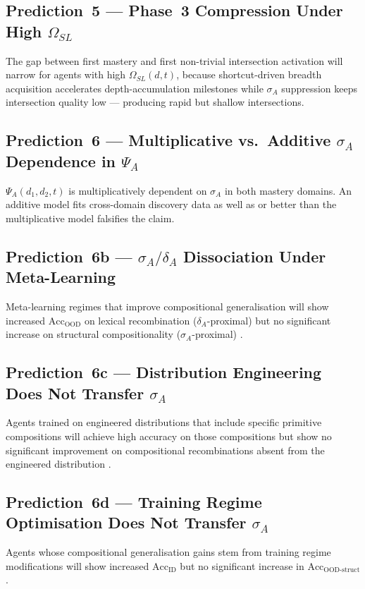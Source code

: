 \documentclass[11pt,a4paper]{article}
\begin{document}
\subsection{Prediction~5 --- Phase~3 Compression Under High \texorpdfstring{$\Omega_{SL}$}{Omega\_AI}}
The gap between first mastery and first non-trivial intersection
activation will narrow for agents with high $\Omega_{SL}(d,t)$, because shortcut-driven breadth acquisition accelerates depth-accumulation milestones while $\sigma_A$ suppression keeps intersection quality low --- producing rapid but shallow intersections.

\subsection{Prediction~6 --- Multiplicative vs.\ Additive \texorpdfstring{$\sigma_A$}{sigma\_A}
Dependence in \texorpdfstring{$\Psi_A$}{Psi\_A}}
$\Psi_A(d_1,d_2,t)$ is multiplicatively dependent on $\sigma_A$ in both
mastery domains. An additive model fits cross-domain discovery data as
well as or better than the multiplicative model falsifies the claim.

\subsection{Prediction~6b --- \texorpdfstring{$\sigma_A/\delta_A$}{sigma\_A/delta\_A} Dissociation Under
Meta-Learning}
Meta-learning regimes that improve compositional generalisation will
show increased $\text{Acc}_{\text{OOD}}$ on lexical recombination
($\delta_A$-proximal) but no significant increase on structural
compositionality ($\sigma_A$-proximal)
\citep{lake2023humanlikesystematicgeneralization}.

\subsection{Prediction~6c --- Distribution Engineering Does Not Transfer
\texorpdfstring{$\sigma_A$}{sigma\_A}}
Agents trained on engineered distributions that include specific
primitive compositions will achieve high accuracy on those compositions
but show no significant improvement on compositional recombinations
absent from the engineered distribution
\citep{patel2022revisitingcompositionalgeneralization}.

\subsection{Prediction~6d --- Training Regime Optimisation Does Not
Transfer \texorpdfstring{$\sigma_A$}{sigma\_A}}
Agents whose compositional generalisation gains stem from training regime
modifications will show increased $\text{Acc}_{\text{ID}}$ but no
significant increase in $\text{Acc}_{\text{OOD-struct}}$.
\end{document}

